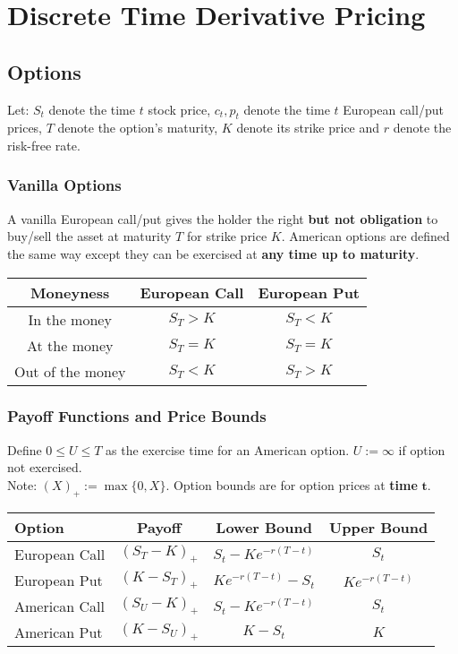 \documentclass[11pt]{article}
\begin{document}
	\section{Discrete Time Derivative Pricing}
	\subsection{Options}
	Let: \( S_t \) denote the time \( t \) stock price, \( c_t, p_t \) denote the time \( t \) European call/put prices, \( T \) denote the option's maturity, \( K \) denote its strike price and \( r \) denote the risk-free rate.
	\subsubsection{Vanilla Options}
	A vanilla European call/put gives the holder the right \textbf{but not obligation} to buy/sell the asset at maturity \( T \) for strike price \( K \). American options are defined the same way except they can be exercised at \textbf{any time up to maturity}.
	\begin{center}
		\begin{tabular}{ccc}
			\hline
			\hline
			\textbf{Moneyness} & \textbf{European Call} & \textbf{European Put} \\
			\hline
			In the money & \( S_T > K \) & \( S_T < K \)\\
			\hline
			At the money & \( S_T = K \) & \( S_T = K \)\\
			\hline
			Out of the money &  \( S_T < K \)& \( S_T > K \)\\
			\hline
			\end{tabular}
		\end{center}
	\subsubsection{Payoff Functions and Price Bounds}
	Define \( 0\leq U\leq T \) as the exercise time for an American option. \( U:=\infty \) if option not exercised. \\Note: \( (X)_{+} := \max\{0, X\} \). Option bounds are for option prices at \textbf{time} \( \bm{t} \).
	\begin{center}
		\def\arraystretch{1.25}
		\begin{tabular}{lccc}
			\hline
			\hline
			\textbf{Option} & \textbf{Payoff} & \textbf{Lower Bound} & \textbf{Upper Bound} \\
			\hline
			European Call & \( (S_T - K)_{+} \) & \( S_t - Ke^{-r(T - t)} \) & \( S_t \)\\
			\hline
			European Put & \( (K - S_T)_{+} \) & \( Ke^{-r(T - t)} - S_t \) & \( Ke^{-r(T - t)} \) \\
			\hline
			American Call & \( (S_U - K)_{+} \) & \( S_t - Ke^{-r(T - t)} \) & \( S_t \)\\
			\hline
			American Put & \( (K - S_U)_{+} \) & \( K - S_t \) & \( K \)\\
			\hline
			\end{tabular}
		\end{center}
\end{document}
